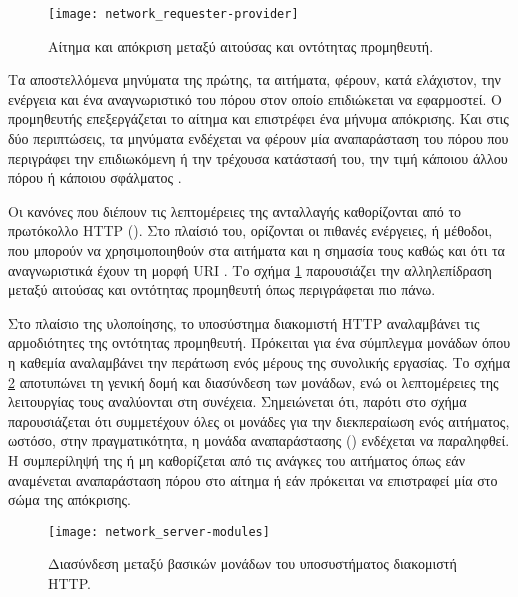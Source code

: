\begin{figure}
    \caption{Αίτημα και απόκριση μεταξύ αιτούσας και οντότητας προμηθευτή.
    \label{fig:network:requester-provider}}
    \begin{center}
    \texttt{[image: network\_requester-provider]}
    \end{center}
\end{figure}

Τα αποστελλόμενα μηνύματα της πρώτης, τα αιτήματα, φέρουν, κατά ελάχιστον, την
ενέργεια και ένα αναγνωριστικό του πόρου στον οποίο επιδιώκεται να εφαρμοστεί.
Ο προμηθευτής επεξεργάζεται το αίτημα και επιστρέφει ένα μήνυμα απόκρισης. Και
στις δύο περιπτώσεις, τα μηνύματα ενδέχεται να φέρουν μία αναπαράσταση του
πόρου που περιγράφει την επιδιωκόμενη ή την τρέχουσα κατάστασή του, την τιμή
κάποιου άλλου πόρου ή κάποιου σφάλματος \parencite[90--92]{fielding00}.

Οι κανόνες που διέπουν τις λεπτομέρειες της ανταλλαγής καθορίζονται από το
πρωτόκολλο HTTP (). Στο πλαίσιό του, ορίζονται
οι πιθανές ενέργειες, ή μέθοδοι, που μπορούν να χρησιμοποιηθούν στα αιτήματα και
η σημασία τους καθώς και ότι τα αναγνωριστικά έχουν τη μορφή URI
\parencite[36--37,52--57]{rfc2616}. Το σχήμα
\ref{fig:network:requester-provider} παρουσιάζει την αλληλεπίδραση μεταξύ
αιτούσας και οντότητας προμηθευτή όπως περιγράφεται πιο πάνω.

Στο πλαίσιο της υλοποίησης, το υποσύστημα διακομιστή HTTP αναλαμβάνει τις
αρμοδιότητες της οντότητας προμηθευτή. Πρόκειται για ένα σύμπλεγμα μονάδων όπου
η καθεμία αναλαμβάνει την περάτωση ενός μέρους της συνολικής εργασίας. Το σχήμα
\ref{fig:network:server-module} αποτυπώνει τη γενική δομή και
διασύνδεση των
μονάδων, ενώ οι λεπτομέρειες της λειτουργίας τους αναλύονται στη συνέχεια.
Σημειώνεται ότι, παρότι στο σχήμα παρουσιάζεται ότι συμμετέχουν όλες οι μονάδες
για την διεκπεραίωση ενός αιτήματος, ωστόσο, στην πραγματικότητα, η μονάδα
αναπαράστασης () ενδέχεται να παραληφθεί. Η
συμπερίληψή της ή μη καθορίζεται από τις ανάγκες του αιτήματος όπως εάν
αναμένεται αναπαράσταση πόρου στο αίτημα ή εάν πρόκειται να επιστραφεί μία στο
σώμα της απόκρισης.

\begin{figure}
    \caption{Διασύνδεση μεταξύ βασικών μονάδων του υποσυστήματος διακομιστή
    HTTP.
    \label{fig:network:server-module}}
    \begin{center}
    \texttt{[image: network\_server-modules]}
    \end{center}
\end{figure}


